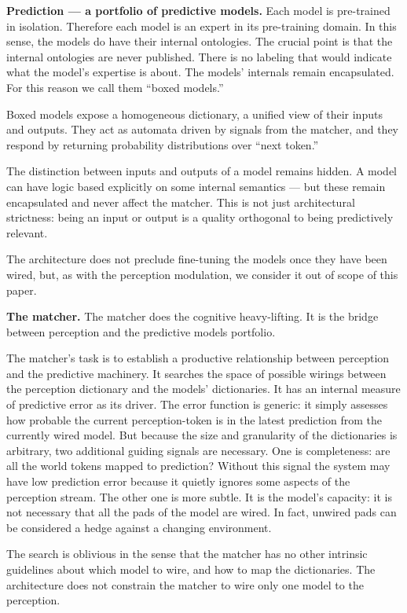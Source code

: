 \documentclass[12pt, a4paper]{article}
\begin{document}
\textbf{Prediction --- a portfolio of predictive models.} Each model is
pre-trained in isolation. Therefore each model is an expert in its
pre-training domain. In this sense, the models do have their internal
ontologies. The crucial point is that the internal ontologies are never
published. There is no labeling that would indicate what the model's
expertise is about. The models' internals remain encapsulated. For this
reason we call them ``boxed models.''

Boxed models expose a homogeneous dictionary, a unified view of their
inputs and outputs. They act as automata driven by signals from the
matcher, and they respond by returning probability distributions over
``next token.''

The distinction between inputs and outputs of a model remains hidden. A
model can have logic based explicitly on some internal semantics --- but
these remain encapsulated and never affect the matcher. This is not just
architectural strictness: being an input or output is a quality
orthogonal to being predictively relevant.

The architecture does not preclude fine-tuning the models once they have
been wired, but, as with the perception modulation, we consider it out
of scope of this paper.

\textbf{The matcher.} The matcher does the cognitive heavy-lifting. It
is the bridge between perception and the predictive models portfolio.

The matcher's task is to establish a productive relationship between
perception and the predictive machinery. It searches the space of
possible wirings between the perception dictionary and the models'
dictionaries. It has an internal measure of predictive error as its
driver. The error function is generic: it simply assesses how probable
the current perception-token is in the latest prediction from the
currently wired model. But because the size and granularity of the
dictionaries is arbitrary, two additional guiding signals are necessary.
One is completeness: are all the world tokens mapped to prediction?
Without this signal the system may have low prediction error because it
quietly ignores some aspects of the perception stream. The other one is
more subtle. It is the model's capacity: it is not necessary that all
the pads of the model are wired. In fact, unwired pads can be considered
a hedge against a changing environment.

The search is oblivious in the sense that the matcher has no other
intrinsic guidelines about which model to wire, and how to map the
dictionaries. The architecture does not constrain the matcher to wire
only one model to the perception.
\end{document}
